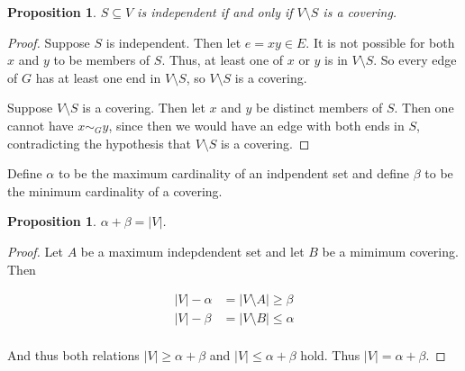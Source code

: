 \documentclass[12pt]{amsart}
\newtheorem{prop}[thm]{Proposition}
\theoremstyle{definition}
\begin{document}
\begin{prop}
$S \subseteq V$ is independent if and only if $V \setminus S$ is a covering.
\end{prop}

\begin{proof}
Suppose $S$ is independent. Then let $e = xy \in E$. It is not possible for both $x$ and
$y$ to be members of $S$. Thus, at least one of $x$ or $y$ is in $V \setminus S$. So every edge
of $G$ has at least one end in $V \setminus S$, so $V \setminus S$ is a covering.

Suppose $V \setminus S$ is a covering. Then let $x$ and $y$ be distinct members of $S$. Then one
cannot have $x \sim_G y$, since then we would have an edge with both ends in $S$, contradicting the
hypothesis that $V \setminus S$ is a covering.
\end{proof}

Define $\alpha$ to be the maximum cardinality of an indpendent set and define $\beta$ to be the
minimum cardinality of a covering.

\begin{prop}
$\alpha + \beta = |V|$.
\end{prop}

\begin{proof}
Let $A$ be a maximum indepdendent set and let $B$ be a mimimum covering. Then

\begin{align*}
  |V| - \alpha &= |V \setminus A| \geq \beta \\
  |V| - \beta  &= |V \setminus B| \leq \alpha \\
\end{align*}

And thus both relations $|V| \geq \alpha + \beta$ and $|V| \leq \alpha + \beta$ hold.
Thus $|V| = \alpha + \beta$.
\end{proof}
\end{document}
